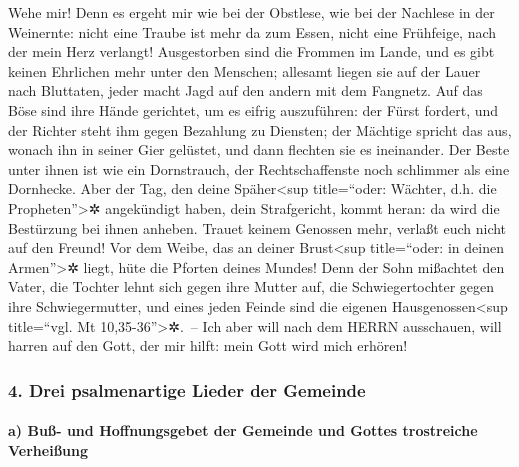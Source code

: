Wehe mir! Denn es ergeht mir wie bei der Obstlese, wie bei
der Nachlese in der Weinernte: nicht eine Traube ist mehr da zum Essen,
nicht eine Frühfeige, nach der mein Herz verlangt!
Ausgestorben sind die Frommen im Lande, und es gibt keinen
Ehrlichen mehr unter den Menschen; allesamt liegen sie auf der Lauer
nach Bluttaten, jeder macht Jagd auf den andern mit dem Fangnetz.
Auf das Böse sind ihre Hände gerichtet, um es eifrig
auszuführen: der Fürst fordert, und der Richter steht ihm gegen
Bezahlung zu Diensten; der Mächtige spricht das aus, wonach ihn in
seiner Gier gelüstet, und dann flechten sie es ineinander.
Der Beste unter ihnen ist wie ein Dornstrauch, der
Rechtschaffenste noch schlimmer als eine Dornhecke. Aber der Tag, den
deine Späher\textless sup title=``oder: Wächter, d.h. die
Propheten''\textgreater✲ angekündigt haben, dein Strafgericht, kommt
heran: da wird die Bestürzung bei ihnen anheben. Trauet
keinem Genossen mehr, verlaßt euch nicht auf den Freund! Vor dem Weibe,
das an deiner Brust\textless sup title=``oder: in deinen
Armen''\textgreater✲ liegt, hüte die Pforten deines Mundes!
Denn der Sohn mißachtet den Vater, die Tochter lehnt sich
gegen ihre Mutter auf, die Schwiegertochter gegen ihre Schwiegermutter,
und eines jeden Feinde sind die eigenen Hausgenossen\textless sup
title=``vgl. Mt 10,35-36''\textgreater✲.~-- Ich aber will
nach dem HERRN ausschauen, will harren auf den Gott, der mir hilft: mein
Gott wird mich erhören!

\hypertarget{drei-psalmenartige-lieder-der-gemeinde}{%
\subsubsection{4. Drei psalmenartige Lieder der
Gemeinde}\label{drei-psalmenartige-lieder-der-gemeinde}}

\hypertarget{a-buuxdf--und-hoffnungsgebet-der-gemeinde-und-gottes-trostreiche-verheiuxdfung}{%
\paragraph{a) Buß- und Hoffnungsgebet der Gemeinde und Gottes
trostreiche
Verheißung}\label{a-buuxdf--und-hoffnungsgebet-der-gemeinde-und-gottes-trostreiche-verheiuxdfung}}

